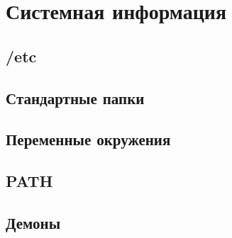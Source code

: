\section{Системная информация}
\subsection{/etc}
\subsection{Стандартные папки}
\subsection{Переменные окружения}
\subsection{PATH}
\subsection{Демоны}

\newpage
